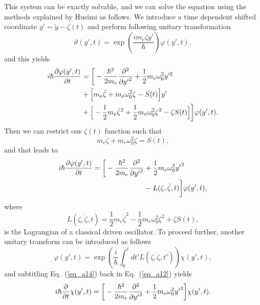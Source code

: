 This system can be exactly solvable, and we can solve the equation using the methods explained by Husimi \cite{husimi53} as follows. We introduce a time dependent shifted coordinate $ y' = \tilde{y} - \zeta(t)$ and perform following unitary transformation
\begin{equation} \label{eq_a9}
    \vartheta(y',t) = \exp(\frac{im_e\dot{\zeta}y'}{\hbar})\varphi(y',t),
\end{equation}
and this yields
\begin{equation} \label{eq_a10}
  \begin{aligned}
    i \hbar \pdv{\varphi(y',t)}{t}   &=
    \bigg[
        -  \frac{\hbar^2}{2m_e}\pdv[2]{{y'}}
        + \frac{1}{2} m_e \omega_0^2 y'^2 \\
        & +
        \Big[
            m_e\ddot{\zeta} + m_e\omega_0^2\zeta - S(t)
        \Big]y' \\
        &
        +
        \Big[
            - \frac{1}{2} m_e\dot{\zeta}^2 + \frac{1}{2}m_e\omega_0^2 \zeta^2 - \zeta S(t)
        \Big]
    \bigg]\varphi(y',t).
  \end{aligned}
\end{equation}
Then we can restrict our $\zeta(t)$ function such that
\begin{equation} \label{eq_a11}
  m_e\ddot{\zeta} + m_e\omega_0^2\zeta = S(t),
\end{equation}
and that leads to
\begin{equation} \label{eq_a12}
  \begin{aligned}
    i \hbar \pdv{\varphi(y',t)}{t}   =
    \bigg[
        -  \frac{\hbar^2}{2m_e}\pdv[2]{{y'}} &
        + \frac{1}{2} m_e \omega_0^2 {y'}^2 \\
        &
        - L(\zeta,\dot{\zeta},t)
    \bigg]\varphi(y',t),
  \end{aligned}
\end{equation}
where
\begin{equation} \label{eq_a13}
  L(\zeta,\dot{\zeta},t) = \frac{1}{2} m_e\dot{\zeta}^2 - \frac{1}{2}m_e\omega_0^2 \zeta^2 + \zeta S(t),
\end{equation}
is the Lagrangian of a classical driven oscillator. To proceed further, another unitary transform can be introduced as follows
\begin{equation} \label{eq_a14}
    \varphi(y',t) = \exp(\frac{i}{\hbar}\int_0^{t}dt'L(\zeta,\dot{\zeta},t')) \chi(y',t),
\end{equation}
and subtitling Eq.~(\ref{eq_a14}) back in Eq.~(\ref{eq_a12}) yields
\begin{equation} \label{eq_a15}
    i \hbar \pdv{t} \chi(y',t)  =
    \bigg[
        -  \frac{\hbar^2}{2m_e}\pdv[2]{{y'}}
        + \frac{1}{2} m_e \omega_0^2 {y'}^2
    \bigg] \chi(y',t).
\end{equation}
